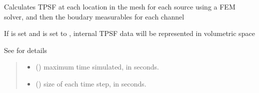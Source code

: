 \documentclass[letterpaper,10pt,english]{sphinxmanual}
\begin{document}
\begin{fulllineitems}
\begin{fulllineitems}
\begin{quote}
\begin{description}
\begin{itemize}
\end{itemize}


\end{description}\end{quote}

\end{fulllineitems}


\begin{fulllineitems}
\label{\detokenize{_autosummary/nirfasterff.base.stnd_mesh.stndmesh:nirfasterff.base.stnd_mesh.stndmesh.femdata_tpsf}}
\pysigstartsignatures
\pysiglinewithargsret
{}
{\sphinxparamcomma {}\sphinxparamcomma {}\sphinxparamcomma {}\sphinxparamcomma {}\sphinxparamcomma {}}
{}
\pysigstopsignatures
\sphinxAtStartPar
Calculates TPSF at each location in the mesh for each source using a FEM solver, and then the boudary measurables for each channel

\sphinxAtStartPar
If  is set and  is set to , internal TPSF data will be represented in volumetric space

\sphinxAtStartPar
See {\hyperref[\detokenize{_autosummary/nirfasterff.forward.femdata.femdata_stnd_TR:nirfasterff.forward.femdata.femdata_stnd_TR}]{}} for details
\begin{quote}\begin{description}
\begin{itemize}
\item {} 
\sphinxAtStartPar
{} () \textendash{} maximum time simulated, in seconds.

\item {} 
\sphinxAtStartPar
{} () \textendash{} size of each time step, in seconds.


\end{itemize}
\end{description}
\end{quote}
\end{fulllineitems}
\end{fulllineitems}
\end{document}
